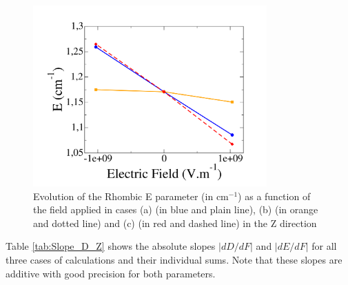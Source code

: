 \documentclass[12pt]{report}
\numberwithin{equation}{section}
\begin{document}
\begin{figure}[!ht]
    \centering
    \includegraphics[width=0.8\textwidth]{Images/E_E_Z.png}
    \caption{Evolution of the Rhombic E parameter (in cm$^{-1}$) as a function of the field applied in cases (a) (in blue and plain line), (b) (in orange and dotted line) and (c) (in red and dashed line) in the Z direction}
    \label{fig:Ni_E_Z}
\end{figure}


Table \ref{tab:Slope_D_Z} shows the absolute slopes $|dD/dF|$ and $|dE/dF|$ for all three cases of calculations and their individual sums.
Note that these slopes are additive with good precision for both parameters.

\begin{table}[!ht]
    \centering
    \caption{Slopes of the straight lines in cases (a), (b) and (c) for the D and E parameter for F//Z}
    \label{tab:Slope_D_Z}
\end{table}
\end{document}
